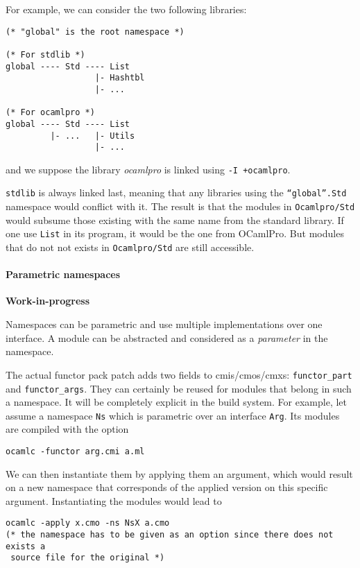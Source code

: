 For example, we can consider the two following libraries:

\begin{verbatim}
(* "global" is the root namespace *)

(* For stdlib *)
global ---- Std ---- List
                  |- Hashtbl
                  |- ...

(* For ocamlpro *)
global ---- Std ---- List
         |- ...   |- Utils
                  |- ...
\end{verbatim}
and we suppose the library \emph{ocamlpro} is linked using \texttt{-I +ocamlpro}.

\texttt{stdlib} is always linked last, meaning that any libraries using the
\texttt{``global''.Std} namespace would conflict with it. The result is that the
modules in \texttt{Ocamlpro/Std} would subsume those existing with the same name
from the standard library. If one use \texttt{List} in its program, it would be
the one from OCamlPro. But modules that do not not exists in
\texttt{Ocamlpro/Std} are still accessible.


\paragraph{Parametric namespaces}

\textbf{Work-in-progress}

Namespaces can be parametric and use multiple implementations over one
interface. A module can be abstracted and considered as a \emph{parameter} in
the namespace. 

The actual functor pack patch adds two fields to cmis/cmos/cmxs:
\lstinline{functor_part} and \lstinline{functor_args}. They can certainly be
reused for modules that belong in such a namespace. It will be completely
explicit in the build system. For example, let assume a namespace \texttt{Ns}
which is parametric over an interface \texttt{Arg}. Its modules are compiled
with the option 

\begin{verbatim}
ocamlc -functor arg.cmi a.ml
\end{verbatim}

We can then instantiate them by applying them an argument, which would result on
a new namespace that corresponds of the applied version on this specific
argument. Instantiating the modules would lead to 

\begin{verbatim}
ocamlc -apply x.cmo -ns NsX a.cmo 
(* the namespace has to be given as an option since there does not exists a
 source file for the original *)
\end{verbatim}


